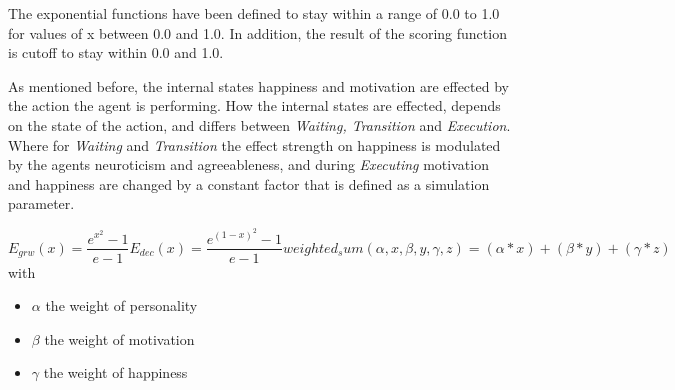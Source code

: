 The exponential functions have been defined to stay within a range of 0.0 to 1.0
for values of x between 0.0 and 1.0. In addition, the result of the scoring function
is cutoff to stay within 0.0 and 1.0.

\bb

As mentioned before, the internal states happiness and motivation are effected by
the action the agent is performing. How the internal states are effected, depends
on the state of the action, and differs between \textit{Waiting, Transition} and \textit{Execution}.
Where for \textit{Waiting} and \textit{Transition} the effect strength on happiness is modulated
by the agents neuroticism and agreeableness, and during \textit{Executing}
motivation and happiness are changed by a constant factor that is defined as a
simulation parameter.

\begin{subequations} 
\label{eq3}
\begin{equation}
    E_{grw}(x) =  \frac{e^{x^2}-1}{e - 1}
\end{equation}
\begin{equation}
    E_{dec}(x) =  \frac{e^{(1 - x)^2}-1}{e - 1}
\end{equation}
\begin{equation}
    weighted_sum(\alpha,x,\beta,y,\gamma,z) = (\alpha * x) + (\beta * y) + (\gamma * z)
\end{equation}
\end{subequations}
with
\begin{itemize}
    \item $\alpha$ the weight of personality
    \item $\beta$ the weight of motivation
    \item $\gamma$ the weight of happiness
\end{itemize}

\begin{figure}[!h]
    \label{Equatin_figures}
\end{figure}

